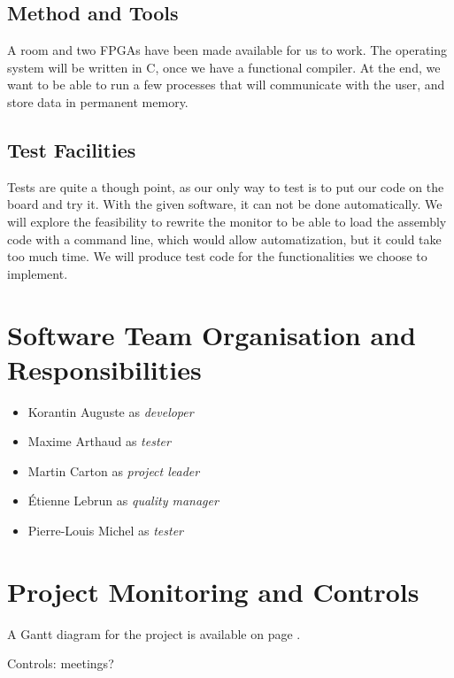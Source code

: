 \documentclass{article}
\begin{document}
    \subsection{Method and Tools}
    A room and two FPGAs have been made available for us to work.
    The operating system will be written in C, once we have a functional
    compiler.
    At the end, we want to be able to run a few processes that will communicate
    with the user, and store data in permanent memory.

     \subsection{Test Facilities}
    Tests are quite a though point, as our only way to test is to put
    our code on the board and try it. With the given software, it can not be
    done automatically.
    We will explore the feasibility to rewrite the monitor to be able to load
    the assembly code with a command line, which would allow automatization, but
    it could take too much time.
    We will produce test code for the functionalities we choose to implement.

  \section{Software Team Organisation and Responsibilities}
    \begin{itemize}
      \item Korantin Auguste as \textit{developer}
      \item Maxime Arthaud as \textit{tester}
      \item Martin Carton as \textit{project leader}
      \item Étienne Lebrun as \textit{quality manager}
      \item Pierre-Louis Michel as \textit{tester}
    \end{itemize}

  \section{Project Monitoring and Controls}
    A Gantt diagram for the project is available on page \pageref{fig:gantt}.

    Controls: meetings?

\end{document}

